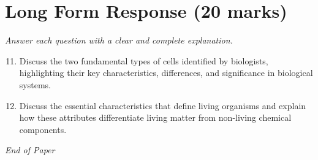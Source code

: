 \documentclass[12pt]{article}
\begin{document}
\section*{Long Form Response (20 marks)}
\textit{Answer each question with a clear and complete explanation.}
\begin{enumerate}[label=\arabic*.]
\setcounter{enumi}{10}
\item Discuss the two fundamental types of cells identified by biologists, highlighting their key characteristics, differences, and significance in biological systems.
\item Discuss the essential characteristics that define living organisms and explain how these attributes differentiate living matter from non-living chemical components.
\end{enumerate}

\vfill
\noindent\textit{End of Paper}
\end{document}
